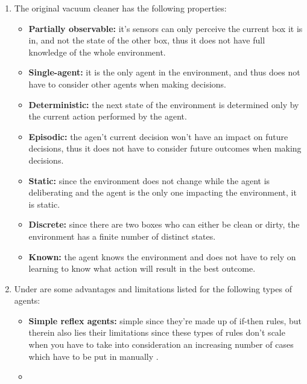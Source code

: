 \begin{enumerate}
\begin{itemize}
    \end{itemize}
  \item
    The original vacuum cleaner has the following properties:
    \begin{itemize}
        \item 
            \textbf{Partially observable:} it's sensors can only perceive the 
            current box it is in, and not the state of the other box, thus it 
            does not have full knowledge of the whole environment. 
        \item 
            \textbf{Single-agent:} it is the only agent in the environment, and 
            thus does not have to consider other agents when making decisions.
        \item 
            \textbf{Deterministic:} the next state of the environment is
            determined only by the current action performed by the agent.
        \item 
            \textbf{Episodic:} the agen't current decision won't have an 
            impact on future decisions, thus it does not have to consider
            future outcomes when making decisions.
        \item 
            \textbf{Static:} since the environment does not change while the
            agent is deliberating and the agent is the only one impacting the 
            environment, it is static.
        \item 
            \textbf{Discrete:} since there are two boxes who can either be clean
            or dirty, the environment has a finite number of distinct states.
        \item 
            \textbf{Known:} the agent knows the environment and does not have to
            rely on learning to know what action will result in the best 
            outcome.
    \end{itemize}
    \autocite[pp.~62--64]{russell2021artificial}
  \item 
    Under are some advantages and limitations listed for the following types 
    of agents:
    \begin{itemize}
    \item 
        \textbf{Simple reflex agents:} simple since they're made up of if-then 
        rules, but therein also lies their limitations since these types of 
        rules don't scale when you have to take into consideration an increasing 
        number of cases which have to be put in manually
        \autocite[pp.~67--69]{russell2021artificial}.
    \item 

\end{itemize}
\end{enumerate}
